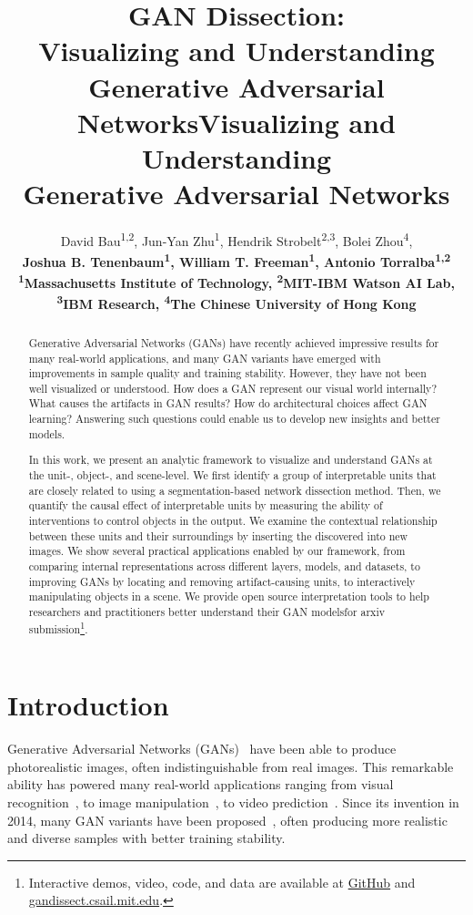 \documentclass{article} %
\title{GAN Dissection: \\ Visualizing and Understanding \\ Generative Adversarial Networks}
\title{Visualizing and Understanding \\ Generative Adversarial Networks}
\author{%
David Bau\textsuperscript{1,2},
Jun-Yan Zhu\textsuperscript{1},
Hendrik Strobelt\textsuperscript{2,3},
Bolei Zhou\textsuperscript{4}, \\
\bf{Joshua B. Tenenbaum}\textsuperscript{1},
\bf{William T. Freeman}\textsuperscript{1},
\bf{Antonio Torralba}\textsuperscript{1,2} \\
\textsuperscript{1}Massachusetts Institute of Technology,
\textsuperscript{2}MIT-IBM Watson AI Lab, \\
\textsuperscript{3}IBM Research,
\textsuperscript{4}The Chinese University of Hong Kong
 }
\author{}
\def\arxiv{for arxiv submission}
\begin{document}
\maketitle

\begin{abstract}
Generative Adversarial Networks (GANs) have recently achieved impressive results for many real-world applications, and many GAN variants have emerged with improvements in sample quality and training stability. However, they have not been well visualized or understood. How does a GAN represent our visual world internally?  What causes the artifacts in GAN results?  How do architectural choices affect GAN learning?  Answering such questions could enable us to develop new insights and better models.

In this work, we present an analytic framework to visualize and understand GANs at the unit-, object-, and scene-level. We first identify a group of interpretable units that are closely related to \concepts using a segmentation-based network dissection method. Then, we quantify the causal effect of interpretable units by measuring the ability of interventions to control objects in the output. We examine the contextual relationship between these units and their surroundings by inserting the discovered \concepts into new images. We show several practical applications enabled by our framework, from comparing internal representations across different layers, models, and datasets, to improving GANs by locating and removing artifact-causing units, to interactively manipulating objects in a scene.  We provide open source interpretation tools to help researchers and practitioners better understand their GAN models\ifdefined\arxiv\footnote{Interactive demos, video, code, and data are available at \href{https://github.com/CSAILVision/gandissect}{GitHub} and \href{https://gandissect.csail.mit.edu}{gandissect.csail.mit.edu}.}\fi.

\end{abstract}
\section{Introduction}
Generative Adversarial Networks (GANs)~\citep{goodfellow2014generative} have been able to produce photorealistic images, often indistinguishable from real images.
This remarkable ability has powered   many real-world applications ranging from visual recognition~\citep{wang2017fast}, to image manipulation~\citep{isola2017image,zhu2017unpaired}, to video prediction~\citep{mathieu2016deep}. Since its invention in 2014, many GAN variants have been proposed~\citep{radford2015unsupervised,zhang2018self}, often producing more realistic and diverse samples with better training stability. 
\end{document}
